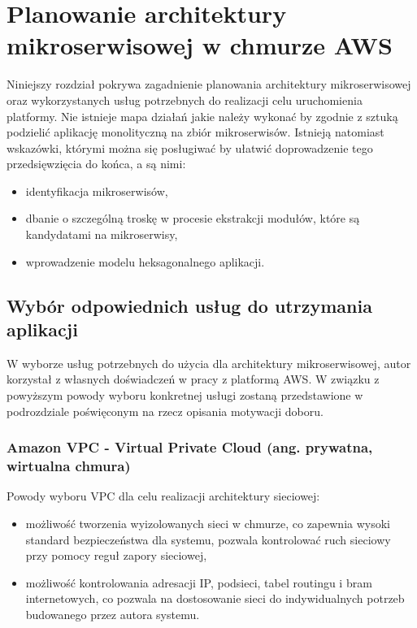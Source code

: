 \documentclass[12pt,twoside]{book}
\begin{document}
    \chapter{Planowanie architektury mikroserwisowej w chmurze AWS}
    Niniejszy rozdział pokrywa zagadnienie planowania architektury mikroserwisowej oraz wykorzystanych usług potrzebnych do realizacji celu uruchomienia platformy. Nie istnieje mapa działań jakie należy wykonać by zgodnie z sztuką podzielić aplikację monolityczną na zbiór mikroserwisów. Istnieją natomiast wskazówki, którymi można się posługiwać by ułatwić doprowadzenie tego przedsięwzięcia do końca, a są nimi:

    \begin{itemize}
        \item identyfikacja mikroserwisów,
        \item dbanie o szczególną troskę w procesie ekstrakcji modułów, które są kandydatami na mikroserwisy,
        \item wprowadzenie modelu heksagonalnego aplikacji. \cite{java.ee.8.design.patterns}
    \end{itemize}


    \section{Wybór odpowiednich usług do utrzymania aplikacji}
    W wyborze usług potrzebnych do użycia dla architektury mikroserwisowej, autor korzystał z własnych doświadczeń w pracy z platformą AWS. W związku z powyższym powody wyboru konkretnej usługi zostaną przedstawione w podrozdziale poświęconym na rzecz opisania motywacji doboru.

    \subsection{Amazon VPC - Virtual Private Cloud (ang. prywatna, wirtualna chmura)}
    Powody wyboru VPC dla celu realizacji architektury sieciowej:

    \begin{itemize}
        \item możliwość tworzenia wyizolowanych sieci w chmurze, co zapewnia wysoki standard bezpieczeństwa dla systemu, pozwala kontrolować ruch sieciowy przy pomocy reguł zapory sieciowej,
        \item możliwość kontrolowania adresacji IP, podsieci, tabel routingu i bram internetowych, co pozwala na dostosowanie sieci do indywidualnych potrzeb budowanego przez autora systemu. \cite{aws.vpc}
    \end{itemize}
\end{document}
